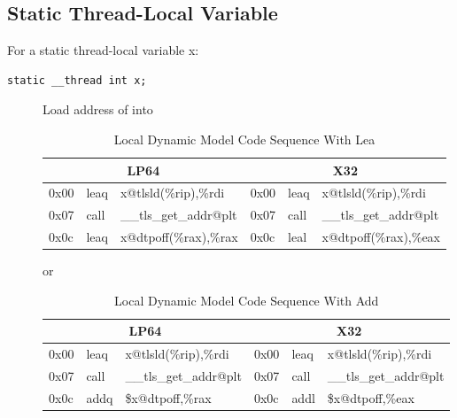 \begin{description}
\end{description}

\subsection{Static Thread-Local Variable}

For a static thread-local variable x:

\begin{verbatim}
static __thread int x;
\end{verbatim}

\begin{description}
\item[]
  Load address of  into 

\begin{table}[H]
\Hrule
\caption{Local Dynamic Model Code Sequence With Lea}
\begin{center}
\code\small{
\begin{tabular}{lll|lll}
\multicolumn{3}{c}{LP64} & \multicolumn{3}{c}{X32} \\
\hline
0x00 & leaq  & x@tlsld(\%rip),\%rdi	& 0x00 & leaq & x@tlsld(\%rip),\%rdi\\
0x07 & call  & \_\_tls\_get\_addr@plt	& 0x07 & call & \_\_tls\_get\_addr@plt\\
0x0c & leaq  & x@dtpoff(\%rax),\%rax	& 0x0c & leal & x@dtpoff(\%rax),\%eax\\
\end{tabular}
}
\end{center}
\Hrule
\end{table}

or

\begin{table}[H]
\Hrule
\caption{Local Dynamic Model Code Sequence With Add}
\begin{center}
\code\small{
\begin{tabular}{lll|lll}
\multicolumn{3}{c}{LP64} & \multicolumn{3}{c}{X32} \\
\hline
0x00 & leaq  & x@tlsld(\%rip),\%rdi	& 0x00 & leaq & x@tlsld(\%rip),\%rdi\\
0x07 & call  & \_\_tls\_get\_addr@plt	& 0x07 & call & \_\_tls\_get\_addr@plt\\
0x0c & addq  & \$x@dtpoff,\%rax		& 0x0c & addl & \$x@dtpoff,\%eax\\
\end{tabular}
}
\end{center}
\Hrule
\end{table}


\end{description}
